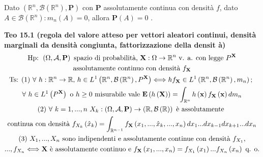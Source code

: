 \documentclass{article}
\begin{document}
Dato $\left( 
\mathbb{R}
^{n},\mathcal{B}\left( 
\mathbb{R}
^{n}\right) ,\mathbf{P}\right) $ con $\mathbf{P}$ assolutamente continua con
densit\`{a} $f$, dato $A\in \mathcal{B}\left( 
\mathbb{R}
^{n}\right) :m_{n}\left( A\right) =0$, allora $\mathbf{P}\left( A\right) =0$%
.

\textbf{Teo 15.1 (regola del valore atteso per vettori aleatori continui,
densit\`{a} marginali da densit\`{a} congiunta, fattorizzazione della densit%
\`{a}) }%
\begin{gather*}
\text{Hp: }\left( \Omega ,\mathcal{A},\mathbf{P}\right) \text{ spazio di
probabilit\`{a}, }\mathbf{X}:\Omega \rightarrow 
\mathbb{R}
^{n}\text{ v. a. con legge }P^{\mathbf{X}} \\
\text{assolutamente continuo con densit\`{a} }f_{\mathbf{X}} \\
\text{Ts: (1) }\forall \text{ }h:%
\mathbb{R}
^{n}\rightarrow 
\mathbb{R}
\text{, }h\in L^{1}\left( 
\mathbb{R}
^{n},\mathcal{B}\left( 
\mathbb{R}
^{n}\right) ,P^{\mathbf{X}}\right) \Longleftrightarrow hf_{\mathbf{X}}\in
L^{1}\left( 
\mathbb{R}
^{n},\mathcal{B}\left( 
\mathbb{R}
^{n}\right) ,m_{n}\right) \text{; } \\
\forall \text{ }h\in L^{1}\left( P^{\mathbf{X}}\right) \text{ o }h\geq 0%
\text{ misurabile vale }\mathbf{E}\left( h\left( \mathbf{X}\right) \right)
=\int_{%
\mathbb{R}
^{n}}h\left( \mathbf{x}\right) f_{\mathbf{X}}\left( \mathbf{x}\right) dm_{n}
\\
\text{(2) }\forall \text{ }k=1,...,n\text{ }X_{k}:\left( \Omega ,\mathcal{A},%
\mathbf{P}\right) \rightarrow \left( 
\mathbb{R}
,\mathcal{B}\left( 
\mathbb{R}
\right) \right) \text{ \`{e} assolutamente } \\
\text{continua con densit\`{a} }f_{X_{k}}\left( \hat{x}_{k}\right) =\int_{%
\mathbb{R}
^{n-1}}f_{\mathbf{X}}\left( x_{1},...,\hat{x}_{k},...,x_{n}\right)
dx_{1}...dx_{k-1}dx_{k+1}...dx_{n} \\
\text{(3) }X_{1},...,X_{n}\text{ sono indipendenti e assolutamente continue
con densit\`{a} }f_{X_{1}}, \\
...,f_{X_{n}}\Longleftrightarrow \mathbf{X}\text{ \`{e} assolutamente
continuo e }f_{\mathbf{X}}\left( x_{1},...,x_{n}\right) =f_{X_{1}}\left(
x_{1}\right) ...f_{X_{n}}\left( x_{n}\right) \text{ q. o.}
\end{gather*}
\end{document}
